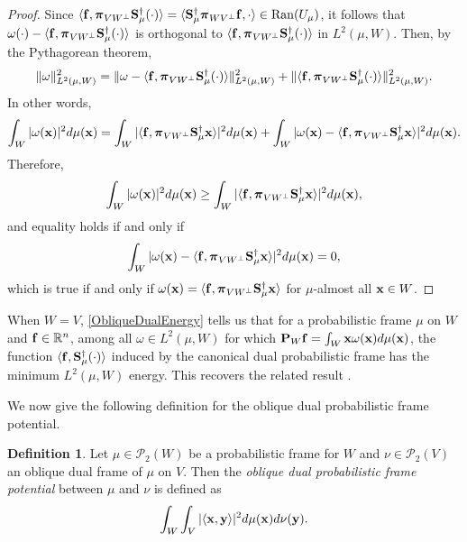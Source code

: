 \documentclass{amsart}
\numberwithin{equation}{section}
\DeclareMathOperator{\range}{Ran}
\newcommand{\bP}{{\mathbf P}}
\newcommand{\bpi}{{\boldsymbol{\pi}}}
\theoremstyle{plain}
\theoremstyle{remark}
\theoremstyle{definition}
\newtheorem{definition}[theorem]{Definition}
\begin{document}
\begin{proof}
Since $\langle {\bf f}, \bpi_{VW^\perp}{\bf S}_\mu^{\dagger} (\cdot) \rangle = \langle {\bf S}_\mu^{\dagger} \bpi_{WV^\perp}{\bf f}, \cdot \rangle \in \range(U_\mu)$, it follows that $\omega(\cdot) - \langle {\bf f},\bpi_{VW^\perp}{\bf S}_\mu^{\dagger} (\cdot) \rangle  $ is orthogonal to $\langle {\bf f}, \bpi_{VW^\perp}{\bf S}_\mu^{\dagger}(\cdot) \rangle $ in $L^2(\mu, W)$. Then, by the Pythagorean theorem, 
\begin{equation*}
        \Vert \omega \Vert_{L^2(\mu, W)}^2 = \Vert \omega - \langle {\bf f}, \bpi_{VW^\perp}{\bf S}_\mu^{\dagger}(\cdot) \rangle \Vert_{L^2(\mu, W)}^2 + \Vert \langle {\bf f}, \bpi_{VW^\perp}{\bf S}_\mu^{\dagger}(\cdot) \rangle \Vert_{L^2(\mu, W)}^2.
    \end{equation*}
In other words, 
\begin{equation*}
       \int_{W} |\omega({\bf x})|^2 d\mu({\bf x}) =  \int_{W} |\langle {\bf f}, \bpi_{VW^\perp}{\bf S}_\mu^{\dagger}{\bf x} \rangle|^2  d\mu({\bf x}) + \int_{W} \vert \omega({\bf x})-\langle {\bf f}, \bpi_{VW^\perp}{\bf S}_\mu^{\dagger}{\bf x} \rangle \vert^2 d\mu({\bf x}).
    \end{equation*}
 Therefore, 
    \begin{equation*}
       \int_{W} |\omega({\bf x})|^2 d\mu({\bf x}) \geq  \int_{W} |\langle {\bf f}, \bpi_{VW^\perp}{\bf S}_\mu^{\dagger}{\bf x} \rangle|^2  d\mu({\bf x}) ,
    \end{equation*}
and equality holds if and only if
    \begin{equation*}
       \int_{W} \vert \omega({\bf x})-\langle {\bf f}, \bpi_{VW^\perp}{\bf S}_\mu^{\dagger}{\bf x} \rangle \vert^2 d\mu({\bf x}) = 0,
    \end{equation*}
  which is true if and only if 
$\omega ({\bf x}) = \langle {\bf f}, \bpi_{VW^\perp}{\bf S}_\mu^{\dagger} {\bf x} \rangle$ for $\mu$-almost all ${\bf x} \in W$.
\end{proof}

When $W=V$, \cref{ObliqueDualEnergy} tells us that for a probabilistic frame $\mu$ on $W$ and ${\bf f} \in \mathbb{R}^n$, among all $\omega \in L^2(\mu, W)$ for which $\bP_{W}{\bf f} = \int_{W} {\bf x} \omega({\bf x}) d\mu({\bf x})$,
the function $\langle {\bf f}, {\bf S}_\mu^{\dagger} (\cdot) \rangle$ induced by the canonical dual probabilistic frame has the minimum $L^2(\mu, W)$ energy. This recovers the related result \cite[Proposition~3.4]{chen2025probabilistic}. 

We now give the following definition for the oblique dual probabilistic frame potential. 
\begin{definition}
 Let $\mu \in \mathcal{P}_2(W)$ be a probabilistic frame for $W$ and $\nu \in \mathcal{P}_2(V)$ an oblique dual frame of $\mu$ on $V$. Then the \emph{oblique dual probabilistic frame potential} between $\mu$ and $\nu$ is defined as
    \begin{equation*}
         \int_{W}  \int_{V}  |\langle {\bf x}, {\bf y} \rangle|^2 d\mu({\bf x}) d\nu({\bf y}).
    \end{equation*}
\end{definition}
\end{document}
